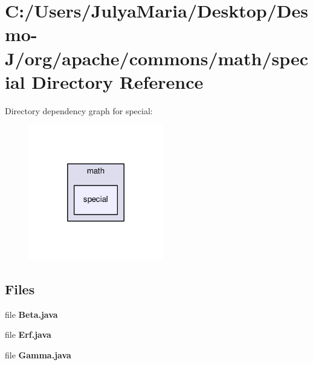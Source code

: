 \section{C\-:/\-Users/\-Julya\-Maria/\-Desktop/\-Desmo-\/\-J/org/apache/commons/math/special Directory Reference}
\label{dir_1f07c5a3ab7c3237834d1f3db83115ae}
Directory dependency graph for special\-:
\nopagebreak
\begin{figure}[H]
\begin{center}
\leavevmode
\includegraphics[width=166pt]{dir_1f07c5a3ab7c3237834d1f3db83115ae_dep}
\end{center}
\end{figure}
\subsection*{Files}
\begin{DoxyCompactItemize}
\item 
file {\bfseries Beta.\-java}
\item 
file {\bfseries Erf.\-java}
\item 
file {\bfseries Gamma.\-java}
\end{DoxyCompactItemize}
